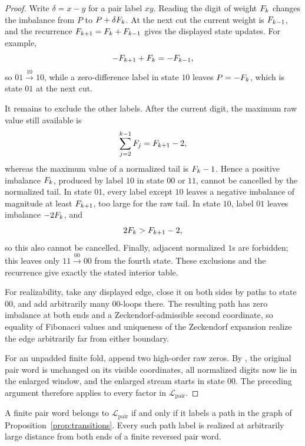 \begin{proof}
Write \(\delta=x-y\) for a pair label \(xy\). Reading the digit of weight \(F_k\) changes the imbalance from \(P\) to \(P+\delta F_k\). At the next cut the current weight is \(F_{k-1}\), and the recurrence \(F_{k+1}=F_k+F_{k-1}\) gives the displayed state updates. For example,
\[
-F_{k+1}+F_k=-F_{k-1},
\]
so \(01\xrightarrow{10}10\), while a zero-difference label in state \(10\) leaves \(P=-F_k\), which is state \(01\) at the next cut.

It remains to exclude the other labels. After the current digit, the maximum raw value still available is
\[
\sum_{j=2}^{k-1}F_j=F_{k+1}-2,
\]
whereas the maximum value of a normalized tail is \(F_k-1\). Hence a positive imbalance \(F_k\), produced by label \(10\) in state \(00\) or \(11\), cannot be cancelled by the normalized tail. In state \(01\), every label except \(10\) leaves a negative imbalance of magnitude at least \(F_{k+1}\), too large for the raw tail. In state \(10\), label \(01\) leaves imbalance \(-2F_k\), and
\[
2F_k>F_{k+1}-2,
\]
so this also cannot be cancelled. Finally, adjacent normalized \(1\)s are forbidden; this leaves only \(11\xrightarrow{00}00\) from the fourth state. These exclusions and the recurrence give exactly the stated interior table.

For realizability, take any displayed edge, close it on both sides by paths to state \(00\), and add arbitrarily many \(00\)-loops there. The resulting path has zero imbalance at both ends and a Zeckendorf-admissible second coordinate, so equality of Fibonacci values and uniqueness of the Zeckendorf expansion realize the edge arbitrarily far from either boundary.

For an unpadded finite fold, append two high-order raw zeros. By , the original pair word is unchanged on its visible coordinates, all normalized digits now lie in the enlarged window, and the enlarged stream starts in state \(00\). The preceding argument therefore applies to every factor in \(\mathcal L_{\mathrm{pair}}\).
\end{proof}

\begin{proposition}\label{prop:sync-language}
A finite pair word belongs to \(\mathcal L_{\mathrm{pair}}\) if and only if it labels a path in the graph of Proposition~\ref{prop:transitions}. Every such path label is realized at arbitrarily large distance from both ends of a finite reversed pair word.
\end{proposition}

